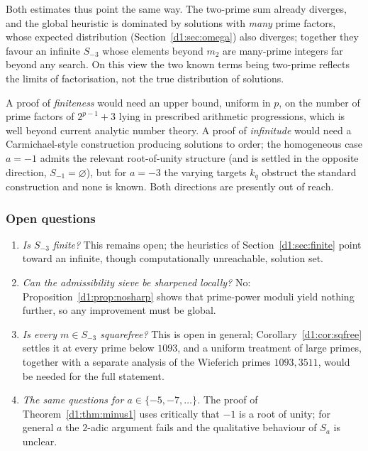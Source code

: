 \documentclass[a4paper]{article}
\theoremstyle{plain}
\theoremstyle{definition}
\theoremstyle{remark}
\begin{document}
Both estimates thus point the same way. The two-prime sum already diverges, and the global
heuristic is dominated by solutions with \emph{many} prime factors, whose expected distribution
(Section~\ref{d1:sec:omega}) also diverges; together they favour an infinite $S_{-3}$ whose elements
beyond $m_{2}$ are many-prime integers far beyond any search. On this view the two known terms
being two-prime reflects the limits of factorisation, not the true distribution of solutions.

A proof of \emph{finiteness} would need an upper bound, uniform in $p$, on the number of prime
factors of $2^{p-1}+3$ lying in prescribed arithmetic progressions, which is well beyond current
analytic number theory. A proof of \emph{infinitude} would need a Carmichael-style construction
producing solutions to order; the homogeneous case $a=-1$ admits the relevant root-of-unity
structure (and is settled in the opposite direction, $S_{-1}=\varnothing$), but for $a=-3$ the
varying targets $k_{q}$ obstruct the standard construction and none is known. Both directions are
presently out of reach.

\subsubsection{Open questions}

\begin{enumerate}[label=\arabic*.]
\item \emph{Is $S_{-3}$ finite?} This remains open; the heuristics of Section~\ref{d1:sec:finite}
point toward an infinite, though computationally unreachable, solution set.
\item \emph{Can the admissibility sieve be sharpened locally?} No: Proposition~\ref{d1:prop:nosharp}
shows that prime-power moduli yield nothing further, so any improvement must be global.
\item \emph{Is every $m\in S_{-3}$ squarefree?} This is open in general;
Corollary~\ref{d1:cor:sqfree} settles it at every prime below $1093$, and a uniform treatment of
large primes, together with a separate analysis of the Wieferich primes $1093,3511$, would be
needed for the full statement.
\item \emph{The same questions for $a\in\{-5,-7,\dots\}$.} The proof of Theorem~\ref{d1:thm:minus1}
uses critically that $-1$ is a root of unity; for general $a$ the $2$-adic argument fails and the
qualitative behaviour of $S_{a}$ is unclear.
\end{enumerate}
\end{document}
